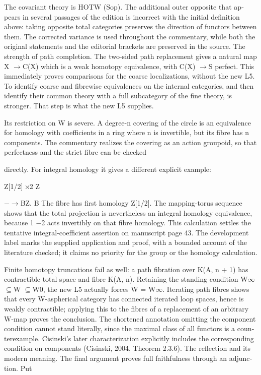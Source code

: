 \begin{otherlanguage}{english}
The covariant theory is HOTW (Sop). The additional outer opposite that appears in several passages of the edition is incorrect with the initial definition above: taking opposite total categories preserves the direction of functors between them. The corrected variance is used throughout the commentary, while both the original statements and the editorial brackets are preserved in the source. The strength of path completion. The two-sided path replacement gives a natural map X \ensuremath{\to}C(X) which is a weak homotopy equivalence, with C(X) \ensuremath{\to}S perfect. This immediately proves comparisons for the coarse localizations, without the new L5. To identify coarse and fibrewise equivalences on the internal categories, and then identify their common theory with a full subcategory of the fine theory, is stronger. That step is what the new L5 supplies.


Its restriction on W is severe. A degree-n covering of the circle is an equivalence for homology with coefficients in a ring where n is invertible, but its fibre has n components. The commentary realizes the covering as an action groupoid, so that perfectness and the strict fibre can be checked


directly. For integral homology it gives a different explicit example:


Z[1/2] \ensuremath{\rtimes}2 Z


  \ensuremath{-}\ensuremath{\to}BZ. B The fibre has first homology Z[1/2]. The mapping-torus sequence shows that the total projection is nevertheless an integral homology equivalence, because 1 \ensuremath{-}2 acts invertibly on that fibre homology. This calculation settles the tentative integral-coefficient assertion on manuscript page 43. The development label marks the supplied application and proof, with a bounded account of the literature checked; it claims no priority for the group or the homology calculation.


Finite homotopy truncations fail as well: a path fibration over K(A, n + 1) has contractible total space and fibre K(A, n). Retaining the standing condition W\ensuremath{\infty}\ensuremath{\subseteq}W \ensuremath{\subseteq}W0, the new L5 actually forces W = W\ensuremath{\infty}. Iterating path fibres shows that every W-aspherical category has connected iterated loop spaces, hence is weakly contractible; applying this to the fibres of a replacement of an arbitrary W-map proves the conclusion. The shortened annotation omitting the component condition cannot stand literally, since the maximal class of all functors is a counterexample. Cisinski’s later characterization explicitly includes the corresponding condition on components (Cisinski, 2004, Theorem 2.3.6). The reflection and its modern meaning. The final argument proves full faithfulness through an adjunction. Put



\end{otherlanguage}
